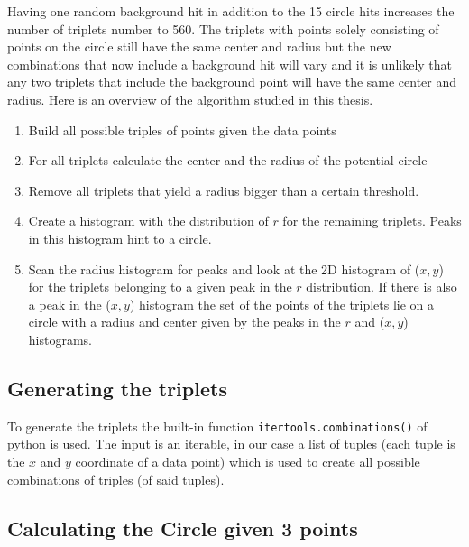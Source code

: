 \documentclass[11pt]{scrreprt}
\begin{document}
Having one random background hit in addition to the 15 circle hits increases the number of triplets number to 560. The triplets with points solely consisting of points on the circle still have the same center and radius but the new combinations that now include a background hit will vary and it is unlikely that any two triplets that include the background point will have the same center and radius. Here is an overview of the algorithm studied in this thesis.

\begin{enumerate}
\item Build all possible triples of points given the data points
\item For all triplets calculate the center and the radius of the potential circle
\item Remove all triplets that yield a radius bigger than a certain threshold.
\item Create a histogram with the distribution of $r$ for the remaining triplets. Peaks in this histogram hint to a circle.
\item Scan the radius histogram for peaks and look at the 2D histogram of ($x,y$) for the triplets belonging to a given peak in the $r$ distribution. If there is also a peak in the ($x,y$) histogram the set of the points of the triplets lie on a circle with a radius and center given by the peaks in the $r$
and ($x,y$) histograms.
\end{enumerate}

\subsection{Generating the triplets} %
\label{sub:generating_the_triples}
To generate the triplets the built-in function \texttt{itertools.combinations()} of python is used. The input is an iterable, in our case a
list of tuples (each tuple is the $x$ and $y$ coordinate of a data point) which is used to create all possible combinations of triples (of said tuples).


\subsection{Calculating the Circle given 3 points}
\end{document}

